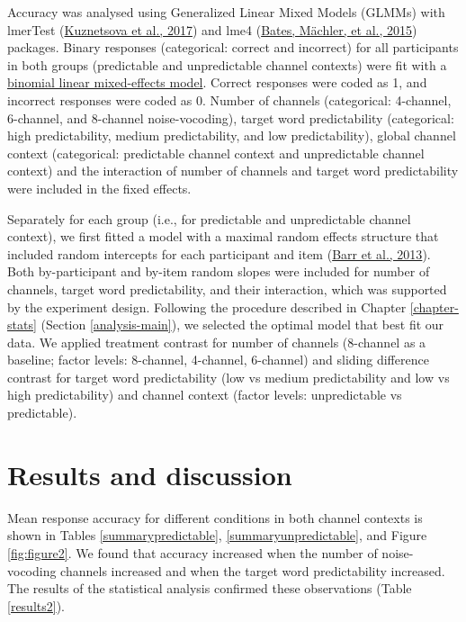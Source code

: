 \documentclass[a4paper, nobind]{templates/ociamthesis}
\begin{document}
Accuracy was analysed using Generalized Linear Mixed Models (GLMMs) with lmerTest (\protect\hyperlink{ref-Kuznetsova2017}{Kuznetsova et al., 2017}) and lme4 (\protect\hyperlink{ref-Bates2015}{Bates, Mächler, et al., 2015}) packages.
Binary responses (categorical: correct and incorrect) for all participants in both groups (predictable and unpredictable channel contexts) were fit with a \protect\hyperlink{binomial-logistic-mixed-effects-model}{binomial linear mixed-effects model}.
Correct responses were coded as 1, and incorrect responses were coded as 0.
Number of channels (categorical: 4-channel, 6-channel, and 8-channel noise-vocoding), target word predictability (categorical: high predictability, medium predictability, and low predictability), global channel context (categorical: predictable channel context and unpredictable channel context) and the interaction of number of channels and target word predictability were included in the fixed effects.

Separately for each group (i.e., for predictable and unpredictable channel context), we first fitted a model with a maximal random effects structure that included random intercepts for each participant and item (\protect\hyperlink{ref-Barr2013}{Barr et al., 2013}).
Both by-participant and by-item random slopes were included for number of channels, target word predictability, and their interaction,
which was supported by the experiment design.
Following the procedure described in Chapter \ref{chapter-stats} (Section \ref{analysis-main}),
we selected the optimal model that best fit our data.
We applied treatment contrast for number of channels (8-channel as a baseline; factor levels: 8-channel, 4-channel, 6-channel) and sliding difference contrast for target word predictability (low vs medium predictability and low vs high predictability) and channel context (factor levels: unpredictable vs predictable).

\hypertarget{results-and-discussion-2}{%
\section{Results and discussion}\label{results-and-discussion-2}}

Mean response accuracy for different conditions in both channel contexts is shown in Tables \ref{summarypredictable}, \ref{summaryunpredictable}, and Figure \ref{fig:figure2}.
We found that accuracy increased when the number of noise-vocoding channels increased and when the target word predictability increased.
The results of the statistical analysis confirmed these observations (Table \ref{results2}).
\end{document}
